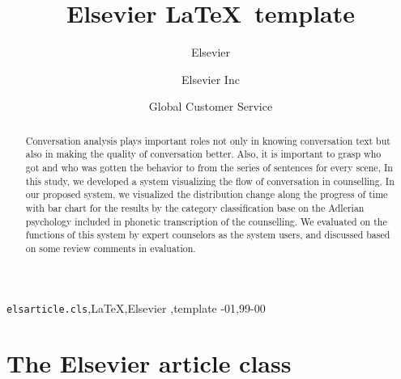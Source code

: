 \documentclass[review]{elsarticle}
\begin{document}
\begin{frontmatter}

\title{Elsevier \LaTeX\ template}

\author{Elsevier}
\address{Radarweg 29, Amsterdam}

\author[mymainaddress,mysecondaryaddress]{Elsevier Inc}

\author[mysecondaryaddress]{Global Customer Service}

\address[mymainaddress]{1600 John F Kennedy Boulevard, Philadelphia}
\address[mysecondaryaddress]{360 Park Avenue South, New York}

\begin{abstract}
  Conversation analysis plays important roles not only in knowing conversation text but also in making the quality of conversation better. Also, it is important to grasp who got and who was gotten the behavior to from the series of sentences for every scene,
  In this study, we developed a system visualizing the flow of conversation in counselling. In our proposed system, we visualized the distribution change along the progress of time with bar chart for the results by the category classification base on the Adlerian psychology included in phonetic transcription of the counselling. We evaluated on the functions of this system by expert counselors as the system users, and discussed based on some review comments in evaluation.
\end{abstract}

\begin{keyword}
\texttt{elsarticle.cls}\sep \LaTeX\sep Elsevier \sep template
-01\sep  99-00
\end{keyword}

\end{frontmatter}

\linenumbers

\section{The Elsevier article class}
\end{document}

